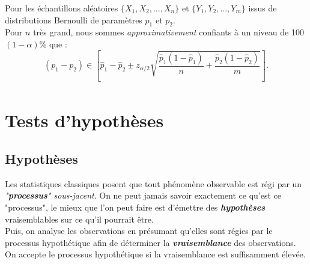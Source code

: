 \documentclass[10pt, french]{article}
\begin{document}
\begin{multicols*}{2}
\begin{definitionNOHFILLsub}
Pour les échantillons aléatoires $\{X_{1}, X_{2}, \dots, X_{n}\}$ et $\{Y_{1}, Y_{2}, \dots, Y_{m}\}$ issus de distributions Bernoulli de paramètres $p_{1}$ et $p_{2}$.\\

Pour $n$ très grand, nous sommes \textit{approximativement} confiants à un niveau de 100$(1 - \alpha)$\% que :
\begin{equation*}
	(p_{1}	-	p_{2}) \in \left[ 
	\hat{p}_{1}	-	\hat{p}_{2}
	\pm	z_{\alpha/2} \sqrt{\frac{\hat{p}_{1}(1 - \hat{p}_{1})}{n} + \frac{\hat{p}_{2}(1 - \hat{p}_{2})}{m}} \right].
\end{equation*}
\begin{align*}
\end{align*}
\end{definitionNOHFILLsub}



\columnbreak
\section{Tests d'hypothèses}
\label{sec:hyp-test}
\subsection{Hypothèses}
\begin{rappel_enhanced}[Contexte]
Les statistiques classiques posent que tout phénomène observable est régi par un \textit{"\textbf{processus}" sous-jacent}. On ne peut jamais savoir exactement ce qu'est ce "processus", le mieux que l'on peut faire est d'émettre des \textit{\textbf{hypothèses}} vraisemblables sur ce qu'il pourrait être. \\

Puis, on analyse les observations en présumant qu'elles sont régies par le processus hypothétique afin de déterminer la \textit{\textbf{vraisemblance}} des observations. On accepte le processus hypothétique si la vraisemblance est suffisamment élevée.




\end{rappel_enhanced}
\end{multicols*}
\end{document}
